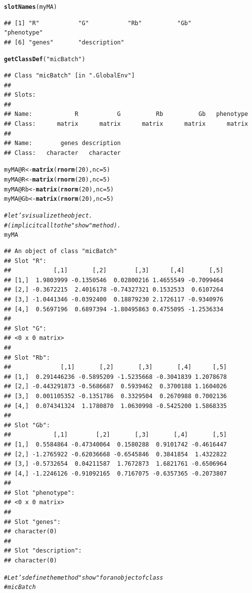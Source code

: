 \documentclass[10pt]{article}\usepackage[]{graphicx}\usepackage[]{color}
\makeatletter
\newcommand{\hlnum}[1]{\textcolor[rgb]{0.686,0.059,0.569}{#1}}%
\newcommand{\hlstr}[1]{\textcolor[rgb]{0.192,0.494,0.8}{#1}}%
\newcommand{\hlcom}[1]{\textcolor[rgb]{0.678,0.584,0.686}{\textit{#1}}}%
\newcommand{\hlopt}[1]{\textcolor[rgb]{0,0,0}{#1}}%
\newcommand{\hlstd}[1]{\textcolor[rgb]{0.345,0.345,0.345}{#1}}%
\newcommand{\hlkwb}[1]{\textcolor[rgb]{0.69,0.353,0.396}{#1}}%
\newcommand{\hlkwc}[1]{\textcolor[rgb]{0.333,0.667,0.333}{#1}}%
\newcommand{\hlkwd}[1]{\textcolor[rgb]{0.737,0.353,0.396}{\textbf{#1}}}%
\newenvironment{kframe}{%
 \def\at@end@of@kframe{}%
 \ifinner\ifhmode%
  \def\at@end@of@kframe{\end{minipage}}%
  \begin{minipage}{\columnwidth}%
 \fi\fi%
 \def\FrameCommand##1{\hskip\@totalleftmargin \hskip-\fboxsep
 \colorbox{shadecolor}{##1}\hskip-\fboxsep
     \hskip-\linewidth \hskip-\@totalleftmargin \hskip\columnwidth}%
 \MakeFramed {\advance\hsize-\width
   \@totalleftmargin\z@ \linewidth\hsize
   \@setminipage}}%
 {\par\unskip\endMakeFramed%
 \at@end@of@kframe}
\newenvironment{knitrout}{}{} %
\makeatother
\begin{document}
\begin{knitrout}
\begin{kframe}
\begin{alltt}
\hlkwd{slotNames}\hlstd{(myMA)}
\end{alltt}
\begin{verbatim}
## [1] "R"           "G"           "Rb"          "Gb"          "phenotype"  
## [6] "genes"       "description"
\end{verbatim}
\begin{alltt}
\hlkwd{getClassDef}\hlstd{(}\hlstr{"micBatch"}\hlstd{)}
\end{alltt}
\begin{verbatim}
## Class "micBatch" [in ".GlobalEnv"]
## 
## Slots:
##                                                                   
## Name:            R           G          Rb          Gb   phenotype
## Class:      matrix      matrix      matrix      matrix      matrix
##                               
## Name:        genes description
## Class:   character   character
\end{verbatim}
\begin{alltt}
\hlstd{myMA}\hlopt{@}\hlkwc{R} \hlkwb{<-} \hlkwd{matrix}\hlstd{(}\hlkwd{rnorm}\hlstd{(}\hlnum{20}\hlstd{),}\hlkwc{nc}\hlstd{=}\hlnum{5}\hlstd{)}
\hlstd{myMA}\hlopt{@}\hlkwc{R} \hlkwb{<-} \hlkwd{matrix}\hlstd{(}\hlkwd{rnorm}\hlstd{(}\hlnum{20}\hlstd{),}\hlkwc{nc}\hlstd{=}\hlnum{5}\hlstd{)}
\hlstd{myMA}\hlopt{@}\hlkwc{Rb} \hlkwb{<-} \hlkwd{matrix}\hlstd{(}\hlkwd{rnorm}\hlstd{(}\hlnum{20}\hlstd{),}\hlkwc{nc}\hlstd{=}\hlnum{5}\hlstd{)}
\hlstd{myMA}\hlopt{@}\hlkwc{Gb} \hlkwb{<-} \hlkwd{matrix}\hlstd{(}\hlkwd{rnorm}\hlstd{(}\hlnum{20}\hlstd{),}\hlkwc{nc}\hlstd{=}\hlnum{5}\hlstd{)}

\hlcom{# let's visualize the object.}
\hlcom{# (implicit call to the "show" method).}
\hlstd{myMA}
\end{alltt}
\begin{verbatim}
## An object of class "micBatch"
## Slot "R":
##            [,1]       [,2]        [,3]      [,4]       [,5]
## [1,]  1.9803999 -0.1350546  0.02800216 1.4655549 -0.7099464
## [2,] -0.3672215  2.4016178 -0.74327321 0.1532533  0.6107264
## [3,] -1.0441346 -0.0392400  0.18879230 2.1726117 -0.9340976
## [4,]  0.5697196  0.6897394 -1.80495863 0.4755095 -1.2536334
## 
## Slot "G":
## <0 x 0 matrix>
## 
## Slot "Rb":
##              [,1]       [,2]       [,3]       [,4]      [,5]
## [1,]  0.291446236 -0.5895209 -1.5235668 -0.3041839 1.2078678
## [2,] -0.443291873 -0.5686687  0.5939462  0.3700188 1.1604026
## [3,]  0.001105352 -0.1351786  0.3329504  0.2670988 0.7002136
## [4,]  0.074341324  1.1780870  1.0630998 -0.5425200 1.5868335
## 
## Slot "Gb":
##            [,1]        [,2]       [,3]       [,4]       [,5]
## [1,]  0.5584864 -0.47340064  0.1580288  0.9101742 -0.4616447
## [2,] -1.2765922 -0.62036668 -0.6545846  0.3841854  1.4322822
## [3,] -0.5732654  0.04211587  1.7672873  1.6821761 -0.6506964
## [4,] -1.2246126 -0.91092165  0.7167075 -0.6357365 -0.2073807
## 
## Slot "phenotype":
## <0 x 0 matrix>
## 
## Slot "genes":
## character(0)
## 
## Slot "description":
## character(0)
\end{verbatim}
\begin{alltt}
\hlcom{# Let's define the method "show" for an object of class}
\hlcom{# micBatch}


\end{alltt}
\end{kframe}
\end{knitrout}
\end{document}
